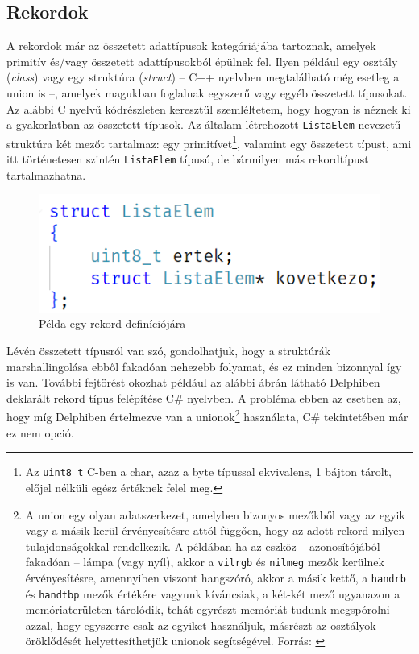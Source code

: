 \documentclass[tocnopagenum]{thesis-ekf}
\theoremstyle{definition}
\theoremstyle{remark}
\begin{document}
	\subsection{Rekordok}
	A rekordok már az összetett adattípusok kategóriájába tartoznak, amelyek primitív és/vagy összetett adattípusokból épülnek fel. Ilyen például egy osztály (\textit{class}) vagy egy struktúra (\textit{struct}) -- C++ nyelvben megtalálható még esetleg a union is --, amelyek magukban foglalnak egyszerű vagy egyéb összetett típusokat.
	Az alábbi C nyelvű kódrészleten keresztül szemléltetem, hogy hogyan is néznek ki a gyakorlatban az összetett típusok. Az általam létrehozott \verb*|ListaElem| nevezetű struktúra két mezőt tartalmaz: egy primitívet\footnote{Az \verb*|uint8_t| C-ben a char, azaz a byte típussal ekvivalens, 1 bájton tárolt, előjel nélküli egész értéknek felel meg.}, valamint egy összetett típust, ami itt történetesen szintén \verb*|ListaElem| típusú, de bármilyen más rekordtípust tartalmazhatna.
	\begin{figure}[h!]
		\centering
		\includegraphics[scale=0.95]{linkedlist_struct}
		\caption{Példa egy rekord definíciójára}
		\label{fig:linkedlist_struct}
	\end{figure}
	
	Lévén összetett típusról van szó, gondolhatjuk, hogy a struktúrák marshallingolása ebből fakadóan nehezebb folyamat, és ez minden bizonnyal így is van. További fejtörést okozhat például az alábbi ábrán látható Delphiben deklarált rekord típus felépítése C\# nyelvben. A probléma ebben az esetben az, hogy míg Delphiben értelmezve van a unionok\footnote{A union egy olyan adatszerkezet, amelyben bizonyos mezőkből vagy az egyik vagy a másik kerül érvényesítésre attól függően, hogy az adott rekord milyen tulajdonságokkal rendelkezik. A példában ha az eszköz -- azonosítójából fakadóan -- lámpa (vagy nyíl), akkor a \verb*|vilrgb| és \verb*|nilmeg| mezők kerülnek érvényesítésre, amennyiben viszont hangszóró, akkor a másik kettő, a \verb*|handrb| és \verb*|handtbp| mezők értékére vagyunk kíváncsiak, a két-két mező ugyanazon a memóriaterületen tárolódik, tehát egyrészt memóriát tudunk megspórolni azzal, hogy egyszerre csak az egyiket használjuk, másrészt az osztályok öröklődését helyettesíthetjük unionok segítségével. Forrás: \cite{jsorber_unions}} használata, C\# tekintetében már ez nem opció.
	
\end{document}
